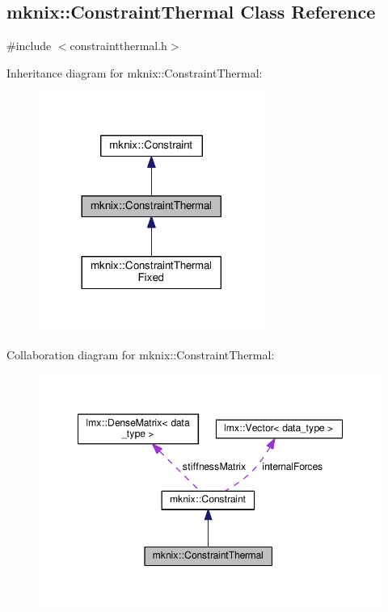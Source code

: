 \hypertarget{classmknix_1_1_constraint_thermal}{}\subsection{mknix\+:\+:Constraint\+Thermal Class Reference}
\label{classmknix_1_1_constraint_thermal}


{\ttfamily \#include $<$constraintthermal.\+h$>$}



Inheritance diagram for mknix\+:\+:Constraint\+Thermal\+:\nopagebreak
\begin{figure}[H]
\begin{center}
\leavevmode
\includegraphics[width=209pt]{d1/d48/classmknix_1_1_constraint_thermal__inherit__graph}
\end{center}
\end{figure}


Collaboration diagram for mknix\+:\+:Constraint\+Thermal\+:\nopagebreak
\begin{figure}[H]
\begin{center}
\leavevmode
\includegraphics[width=348pt]{d1/d0a/classmknix_1_1_constraint_thermal__coll__graph}
\end{center}
\end{figure}

